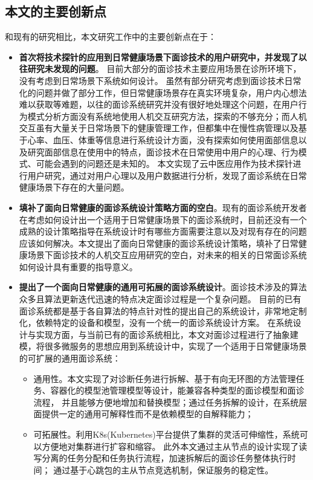 \subsection{本文的主要创新点}
和现有的研究相比，本文研究工作中的主要创新点在于：
\begin{itemize}
    \item \textbf{首次将技术探针的应用到日常健康场景下面诊技术的用户研究中，并发现了以往研究未发现的问题}。
    目前大部分的面诊技术主要应用场景在诊所环境下，没有考虑到日常场景下系统如何设计。
虽然有部分研究考虑到面诊技术日常化的问题并做了部分工作，但日常健康场景存在真实环境复杂，用户内心想法难以获取等难题，以往的面诊系统研究并没有很好地处理这个问题，在用户行为模式分析方面没有系统地使用人机交互研究方法，探索的不够充分；而人机交互虽有大量关于日常场景下的健康管理工作，但都集中在慢性病管理以及基于心率、血压、体重等信息进行系统设计方面，没有探索如何使用面部信息以及研究面部信息在使用中的特点，面诊技术在日常使用中用户的心理、行为模式、可能会遇到的问题还是未知的。
本文实现了云中医应用作为技术探针进行用户研究，通过对用户心理以及用户数据进行分析，发现了面诊系统在日常健康场景下存在的大量问题。
    \item \textbf{填补了面向日常健康的面诊系统设计策略方面的空白}。现有的面诊系统开发者在考虑如何设计出一个适用于日常健康场景下的面诊系统时，目前还没有一个成熟的设计策略指导在系统设计时有哪些方面需要注意以及对现有存在的问题应该如何解决。本文提出了面向日常健康的面诊系统设计策略，填补了日常健康场景下面诊技术的人机交互应用研究的空白\cite{ding2019reading}，对未来的相关的日常面诊系统如何设计具有重要的指导意义。 
    \item \textbf{提出了一个面向日常健康的通用可拓展的面诊系统设计}。面诊技术涉及的算法众多且算法更新迭代迅速的特点决定面诊过程是一个复杂问题。
    目前的已有面诊系统都是基于各自算法的特点针对性的提出自己的系统设计，非常地定制化，依赖特定的设备和模型，没有一个统一的面诊系统设计方案。
    在系统设计与实现方面，与当前已有的面诊系统相比，本文对面诊过程进行了抽象建模，将很多微服务的思想应用到系统设计中，实现了一个适用于日常健康场景的可扩展的通用面诊系统：
        \begin{itemize}
            \item 通用性。本文实现了对诊断任务进行拆解、基于有向无环图的方法管理任务、容器化的模型池管理模型等设计，能兼容各种类型的面诊模型和面诊流程，
            并且能够方便地增加和替换模型；通过任务拆解的设计，在系统层面提供一定的通用可解释性而不是依赖模型的自解释能力；
            \item 可拓展性。利用K8s(Kubernetes)平台提供了集群的灵活可伸缩性，系统可以方便地对集群进行扩容和缩容。
            此外本文通过主从节点的设计实现了读写分离的任务分配和任务执行流程，加速拆解后的面诊任务整体执行时间；
            通过基于心跳包的主从节点竞选机制，保证服务的稳定性。
        \end{itemize}
\end{itemize}


